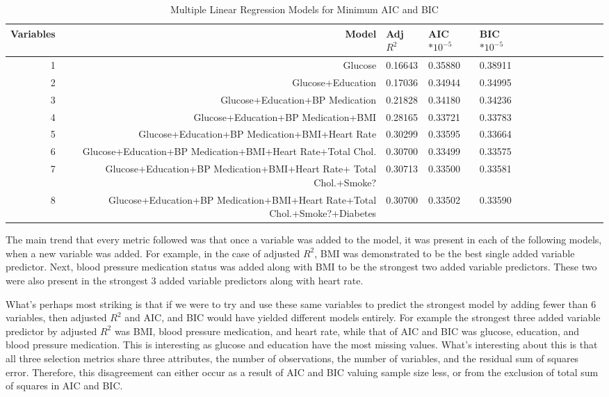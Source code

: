 \documentclass{article}\usepackage[]{graphicx}\usepackage[]{color}
\begin{document}
   \begin{table}[ht]
   \begin{tiny}
\centering
\begin{tabular}{rrlllllllllrr}
  \hline
  Variables & Model & Adj $R^2$ & AIC$*10^{-5}$ & BIC$*10^{-5}$ \\ 
  \hline
  1 & Glucose & 0.16643 & 0.35880 & 0.38911 \\ 
     2 & Glucose+Education & 0.17036 & 0.34944 & 0.34995 \\ 
     3 & Glucose+Education+BP Medication & 0.21828 & 0.34180 & 0.34236 \\ 
     4 & Glucose+Education+BP Medication+BMI & 0.28165 & 0.33721 & 0.33783 \\ 
     5 & Glucose+Education+BP Medication+BMI+Heart Rate & 0.30299 & 0.33595 & 0.33664 \\ 
     6 & Glucose+Education+BP Medication+BMI+Heart Rate+Total Chol. & 0.30700 & 0.33499 & 0.33575 \\ 
     7 & Glucose+Education+BP Medication+BMI+Heart Rate+ Total Chol.+Smoke? & 0.30713 & 0.33500 & 0.33581 \\ 
     8 & Glucose+Education+BP Medication+BMI+Heart Rate+Total Chol.+Smoke?+Diabetes & 0.30700 & 0.33502 & 0.33590 \\ 
   \hline
\end{tabular}
\caption{Multiple Linear Regression Models for Minimum AIC and BIC}
\end{tiny}
\end{table}

The main trend that every metric followed was that once a variable was added to the model, it was present in each of the following models, when a new variable was added.  For example, in the case of adjusted $R^2$, BMI was demonstrated to be the best single added variable predictor. Next, blood pressure medication status was added along with BMI to be the strongest two added variable predictors.  These two were also present in the strongest 3 added variable predictors along with heart rate.  

What's perhaps most striking is that if we were to try and use these same variables to predict the strongest model by adding fewer than 6 variables, then adjusted $R^2$ and AIC, and BIC would have yielded different models entirely.  For example the strongest three added variable predictor by adjusted $R^2$ was BMI, blood pressure medication, and heart rate,  while that of AIC and BIC was glucose, education, and blood pressure medication.  This is interesting as glucose and education have the most missing values.   What's interesting about this is that all three selection metrics share three attributes, the number of observations, the number of variables, and the residual sum of squares error. Therefore, this disagreement can either occur as a result of AIC and BIC valuing sample size less, or from the exclusion of total sum of squares in AIC and BIC.
\end{document}
